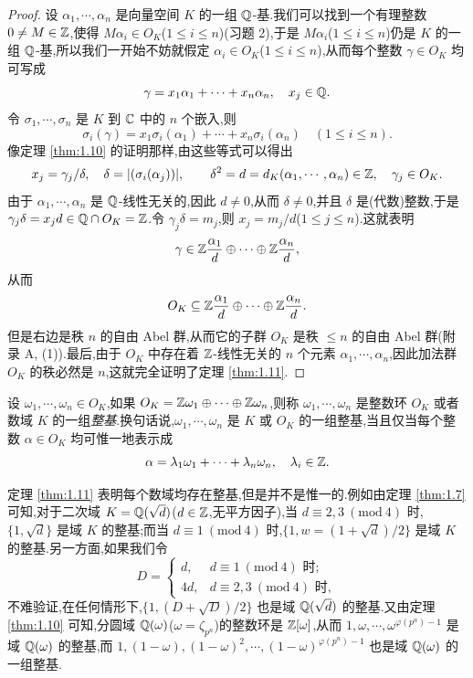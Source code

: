 \begin{proof}
设 $\alpha_1,\cdots,\alpha_n$ 是向量空间 $K$ 的一组 $\mathbb{Q}$-基.我们可以找到一个有理整数 $0\neq M\in\mathbb{Z}$,使得 $M\alpha_i\in O_K$($1\leqslant i\leqslant n$)(习题 2),于是 $M\alpha_i$($1\leqslant i\leqslant n$)仍是 $K$ 的一组 $\mathbb{Q}$-基,所以我们一开始不妨就假定 $\alpha_i\in O_K$($1\leqslant i\leqslant n$),从而每个整数 $\gamma\in O_K$ 均可写成
\[
  \gamma=x_1\alpha_1+\cdots+x_n\alpha_n,\quad x_j\in\mathbb{Q}.
\]
令 $\sigma_1,\cdots,\sigma_n$ 是 $K$ 到 $\mathbb{C}$ 中的 $n$ 个嵌入,则
\[
  \sigma_i(\gamma)=x_1\sigma_i(\alpha_1)+\cdots+x_n\sigma_i(\alpha_n)\quad (1\leqslant i\leqslant n).
\]
像定理 \ref{thm:1.10} 的证明那样,由这些等式可以得出
\[
  x_j=\gamma_j/\delta,\quad \delta=|(\sigma_i(\alpha_j))|,\qquad
  \delta^2=d=d_K(\alpha_1,\cdots,\alpha_n)\in\mathbb{Z},\quad \gamma_j\in O_K.
\]
由于 $\alpha_1,\cdots,\alpha_n$ 是 $\mathbb{Q}$-线性无关的,因此 $d\neq 0$,从而 $\delta\neq 0$,并且 $\delta$ 是(代数)整数,于是 $\gamma_j\delta=x_jd\in\mathbb{Q}\cap O_K=\mathbb{Z}$.令 $\gamma_j\delta=m_j$,则 $x_j=m_j/d$($1\leqslant j\leqslant n$).这就表明
\[
  \gamma\in\mathbb{Z}\frac{\alpha_1}{d}\oplus\cdots\oplus\mathbb{Z}\frac{\alpha_n}{d},
\]
从而
\[
  O_K\subseteq\mathbb{Z}\frac{\alpha_1}{d}\oplus\cdots\oplus\mathbb{Z}\frac{\alpha_n}{d}.
\]
但是右边是秩 $n$ 的自由 Abel 群,从而它的子群 $O_K$ 是秩 $\leqslant n$ 的自由 Abel 群(附录 A, (1)).最后,由于 $O_K$ 中存在着 $\mathbb{Z}$-线性无关的 $n$ 个元素 $\alpha_1,\cdots,\alpha_n$,因此加法群 $O_K$ 的秩必然是 $n$,这就完全证明了定理 \ref{thm:1.11}.
\end{proof}

\begin{definition}\label{def:ch1-3}
设 $\omega_1,\cdots,\omega_n\in O_K$,如果 $O_K=\mathbb{Z}\omega_1\oplus\cdots\oplus\mathbb{Z}\omega_n$,则称 $\omega_1,\cdots,\omega_n$ 是整数环 $O_K$ 或者数域 $K$ 的一组\emph{整基}.换句话说,$\omega_1,\cdots,\omega_n$ 是 $K$ 或 $O_K$ 的一组整基,当且仅当每个整数 $\alpha\in O_K$ 均可惟一地表示成
\[
  \alpha=\lambda_1\omega_1+\cdots+\lambda_n\omega_n,\quad \lambda_i\in\mathbb{Z}.
\]
\end{definition}

定理 \ref{thm:1.11} 表明每个数域均存在整基,但是并不是惟一的.例如由定理 \ref{thm:1.7} 可知,对于二次域 $K=\mathbb{Q}(\sqrt{d})$($d\in\mathbb{Z}$,无平方因子),当 $d\equiv 2,3\ (\mathrm{mod}\ 4)$ 时,$\{1,\sqrt{d}\}$ 是域 $K$ 的整基;而当 $d\equiv 1\ (\mathrm{mod}\ 4)$ 时,$\{1,w=(1+\sqrt{d})/2\}$ 是域 $K$ 的整基.另一方面,如果我们令
\[
  D=\begin{cases}
    d, & d\equiv 1\ (\mathrm{mod}\ 4)\text{ 时};\\
    4d, & d\equiv 2,3\ (\mathrm{mod}\ 4)\text{ 时},
  \end{cases}
\]
不难验证,在任何情形下,$\{1,(D+\sqrt{D})/2\}$ 也是域 $\mathbb{Q}(\sqrt{d})$ 的整基.又由定理 \ref{thm:1.10} 可知,分圆域 $\mathbb{Q}(\omega)$($\omega=\zeta_{p^n}$)的整数环是 $\mathbb{Z}[\omega]$,从而 $1,\omega,\cdots,\omega^{\varphi(p^n)-1}$ 是域 $\mathbb{Q}(\omega)$ 的整基,而 $1,(1-\omega),(1-\omega)^2,\cdots,(1-\omega)^{\varphi(p^n)-1}$ 也是域 $\mathbb{Q}(\omega)$ 的一组整基.

